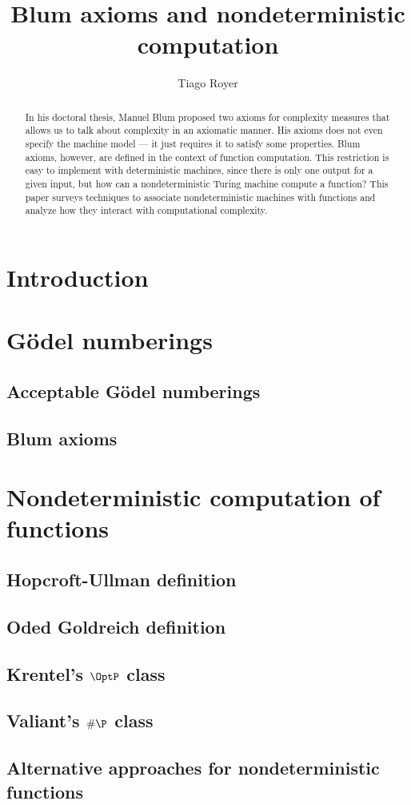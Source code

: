 \documentclass[12pt]{article}
\title{Blum axioms and nondeterministic computation}
\author{Tiago Royer\inst{1}}
\begin{document}
\maketitle

\begin{abstract}
    In his doctoral thesis,
    Manuel Blum proposed two axioms for complexity measures
    that allows us to talk about complexity in an axiomatic manner.
    His axioms does not even specify the machine model
    --- it just requires it to satisfy some properties.
    Blum axioms, however,
    are defined in the context of function computation.
    This restriction is easy to implement with deterministic machines,
    since there is only one output for a given input,
    but how can a nondeterministic Turing machine compute a function?
    This paper surveys techniques to associate
    nondeterministic machines with functions
    and analyze how they interact with computational complexity.
\end{abstract}

\section{Introduction}

\section{Gödel numberings}

\subsection{Acceptable Gödel numberings}

\subsection{Blum axioms}

\section{Nondeterministic computation of functions}

\subsection{Hopcroft-Ullman definition}
\subsection{Oded Goldreich definition}
\subsection{Krentel's $\OptP$ class}
\subsection{Valiant's $\#\P$ class}
\subsection{Alternative approaches for nondeterministic functions}
\end{document}
